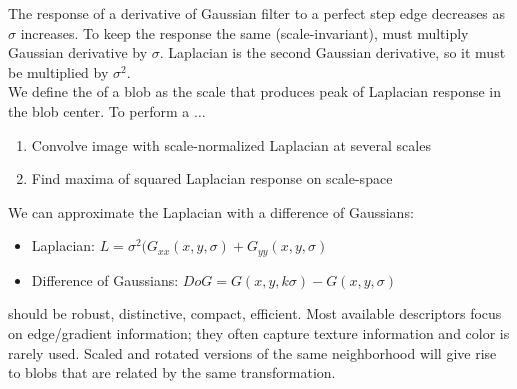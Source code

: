 \documentclass{article}
\begin{document}
The response of a derivative of Gaussian filter to a perfect step edge decreases as $\sigma$ increases. To keep the response the same (scale-invariant), must multiply Gaussian derivative by $\sigma$. Laplacian is the second Gaussian derivative, so it must be multiplied by $\sigma^2$. \\ 

We define the  of a blob as the scale that produces peak of Laplacian response in the blob center. To perform a $\dots$ 
\begin{enumerate}
  \item Convolve image with scale-normalized Laplacian at several scales 
  \item Find maxima of squared Laplacian response on scale-space 
\end{enumerate}

\begin{remark}
  We can approximate the Laplacian with a difference of Gaussians: 
  \begin{itemize}
    \item Laplacian: $L = \sigma^2 (G_{xx}(x,y,\sigma)+G_{yy}(x,y,\sigma)$
    \item Difference of Gaussians: $DoG = G(x,y,k\sigma) - G(x,y,\sigma)$
  \end{itemize}
\end{remark}

 should be robust, distinctive, compact, efficient. Most available descriptors focus on edge/gradient information; they often capture texture information and color is rarely used. Scaled and rotated versions of the same neighborhood will give rise to blobs that are related by the same transformation. \\ 
\end{document}
